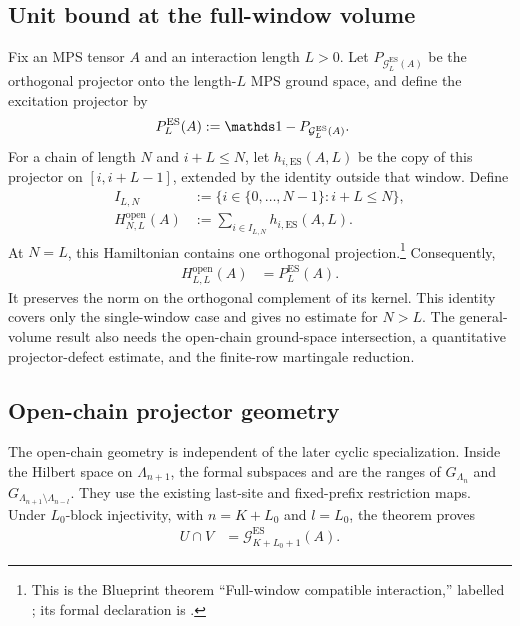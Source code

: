 \documentclass{article}
\begin{document}
\subsection{Unit bound at the full-window volume}

Fix an MPS tensor $A$ and an interaction length $L>0$. Let
$P_{\mathcal G_L^{\mathrm{ES}}(A)}$ be the orthogonal projector onto the
length-$L$ MPS ground space, and define the excitation projector by
\begin{align}
    P_L^{\mathrm{ES}}(A)
     & :=\Id-P_{\mathcal G_L^{\mathrm{ES}}(A)}.
    \label{eq:cpgsv21_martingale_overlap_excitation_projector}
\end{align}
For a chain of length $N$ and $i+L\leq N$, let
$h_{i,\mathrm{ES}}(A,L)$ be the copy of this projector on
$[i,i+L-1]$, extended by the identity outside that window. Define
\begin{align}
    I_{L,N}
     & :=
    \{i\in\{0,\ldots,N-1\}:i+L\leq N\},
    \label{eq:cpgsv21_martingale_overlap_compatible_starts} \\
    H^{\mathrm{open}}_{N,L}(A)
     & :=
    \sum_{i\in I_{L,N}}h_{i,\mathrm{ES}}(A,L).
    \label{eq:cpgsv21_martingale_overlap_open_hamiltonian}
\end{align}
At $N=L$, this Hamiltonian contains one orthogonal
projection.\footnote{This is the Blueprint theorem ``Full-window compatible
    interaction,'' labelled
    ; its formal declaration is
    .}
Consequently,
\begin{align}
    H^{\mathrm{open}}_{L,L}(A)
     & =P_L^{\mathrm{ES}}(A).
    \label{eq:cpgsv21_martingale_overlap_full_window_identity}
\end{align}
It preserves the norm on the orthogonal complement of its kernel. This
identity covers only the single-window case and gives no estimate for $N>L$.
The general-volume result also needs the open-chain ground-space intersection,
a quantitative projector-defect estimate, and the finite-row martingale
reduction.

\subsection{Open-chain projector geometry}

The open-chain geometry is independent of the later cyclic specialization.
Inside the Hilbert space on $\Lambda_{n+1}$, the formal subspaces
 and
 are the ranges of $G_{\Lambda_n}$ and
$G_{\Lambda_{n+1}\setminus\Lambda_{n-l}}$. They use the existing last-site
and fixed-prefix restriction maps. Under $L_0$-block injectivity, with
$n=K+L_0$ and $l=L_0$, the theorem
 proves
\begin{align}
    U\cap V
     & =\mathcal G_{K+L_0+1}^{\mathrm{ES}}(A).
    \label{eq:cpgsv21_martingale_overlap_open_chain_intersection}
\end{align}
\end{document}
